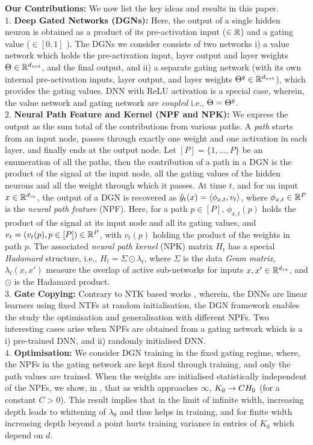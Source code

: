 \textbf{Our Contributions:} We now list the key ideas and results in this paper.\\
$1.$ \textbf{Deep Gated Networks (DGNs):} Here, the output of a single hidden neuron is obtained as a product of its pre-activation input ($\in \mathbb{R}$) and a gating value ($\in [0,1]$ ). The DGNs we consider consists of two networks i) a value network which holds the pre-activation input, layer output and layer weights $\Theta\in \mathbb{R}^{d_{net}}$, and the final output, and ii) a separate gating network (with its own internal pre-activation inputs, layer output, and layer weights ${\Theta}^g\in \mathbb{R}^{d_{net}}$), which provides the gating values. 
DNN with ReLU activation is a special case, wherein, the value network and gating network are \emph{coupled} i.e., $\Theta={\Theta}^g$.\\
$2.$ \textbf{Neural Path Feature and Kernel (NPF and NPK):} We express the output as the sum total of the contributions from various paths. A \emph{path} starts from an input node, passes through exactly one weight and one activation in each layer, and finally ends at the output node. Let $[P]=\{1,\ldots,P\}$ be an enumeration of all the paths, then the contribution of a path in a DGN is the product of the signal at the input node, all the gating values of the hidden neurons and all the weight through which it passes. At time $t$, and for an input $x\in\mathbb{R}^{d_{in}}$,  the output of a DGN is recovered as $\hat{y}_t(x)=\langle \phi_{x,t},v_t\rangle$, where $\phi_{x,t}\in \mathbb{R}^P$ is the \emph{neural path feature} (NPF). Here, for a path $p\in[P]$, $\phi_{x,t}(p)$ holds the product of the signal at its input node and all its gating values, and  $v_t=(v_t(p),p\in[P])\in\mathbb{R}^P$, with $v_t(p)$ holding the product of the weights in path $p$. The associated \emph{neural path kernel} (NPK) matrix $H_t$ has a special \emph{Hadamard} structure, i.e., $H_t=\Sigma \odot \lambda_t$, where $\Sigma$ is the data \emph{Gram matrix}, $\lambda_t(x,x')$ measure the overlap of active sub-networks for inputs $x,x'\in\mathbb{R}^{d_{in}}$, and $\odot$ is the Hadamard product.\\
$3.$ \textbf{Gate Copying:} Contrary to NTK based works \cite{jacot18,jacot19,cao2019generalization,arora2019exact}, wherein, the DNNs are linear learners using fixed NTFs at random initialisation, the DGN framework enables the study the optimisation and generalisation with different NPFs. Two interesting cases arise when NPFs are obtained from a gating network which is a i)  pre-trained DNN, and ii) randomly initialised DNN.\\
$4.$ \textbf{Optimisation:} We consider DGN training in the fixed gating regime, where, the NPFs in the gating network are kept fixed through training, and only the path values are trained. When the weights are initialised statistically independent of the NPFs, we show, in , that as width approaches $\infty$, $K_0\rightarrow C H_0$ (for a constant $C>0$). This result implies that in the limit of infinite width, increasing depth leads to whitening of $\lambda_0$ and thus helps in training, and for finite width increasing depth beyond a point hurts training variance in entries of $K_0$ which depend on $d$. \\
